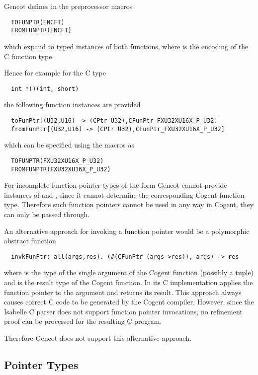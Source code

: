 Gencot defines in  the preprocessor macros 
\begin{verbatim}
  TOFUNPTR(ENCFT)
  FROMFUNPTR(ENCFT)
\end{verbatim}
which expand to typed instances of both functions, where  is the encoding of the C function type.

Hence for example for the C type
\begin{verbatim}
  int *()(int, short)
\end{verbatim}
the following function instances are provided
\begin{verbatim}
  toFunPtr[(U32,U16) -> (CPtr U32),CFunPtr_FXU32XU16X_P_U32]
  fromFunPtr[(U32,U16) -> (CPtr U32),CFunPtr_FXU32XU16X_P_U32]
\end{verbatim}
which can be specified using the macros as
\begin{verbatim}
  TOFUNPTR(FXU32XU16X_P_U32)
  FROMFUNPTR(FXU32XU16X_P_U32)
\end{verbatim}

For incomplete function pointer types of the form  Gencot cannot provide instances of
 and , since it cannot determine the corresponding Cogent function type. Therefore
such function pointers cannot be used in any way in Cogent, they can only be passed through.

An alternative approach for invoking a function pointer would be a polymorphic abstract function 
\begin{verbatim}
  invkFunPtr: all(args,res). (#(CFunPtr (args->res)), args) -> res
\end{verbatim}
where  is the type of the single argument of the Cogent function (possibly a tuple) and 
is the result type of the Cogent function. In its C implementation  applies the function pointer
to the argument and returns its result. 
This approach always causes correct C code to be generated by the Cogent compiler. However, since the Isabelle
C parser does not support function pointer invocations, no refinement proof can be processed for the resulting
C program.

Therefore Gencot does not support this alternative approach.

\subsection{ Pointer Types}
\label{design-operations-null}

